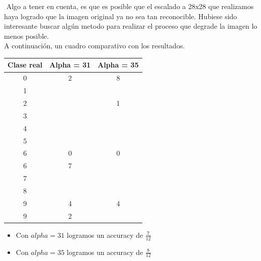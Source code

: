 $ $\newline
Algo a tener en cuenta, es que es posible que el escalado a 28x28 que realizamos haya logrado que la imagen original ya no sea tan reconocible. Hubiese sido interesante buscar algún metodo para realizar el proceso que degrade la imagen lo menos posible. \\

A continuación, un cuadro comparativo con los resultados. \\


\begin{center}
    \begin{tabular}{| c | c | c |}
    \hline
     Clase real    & Alpha = 31  & Alpha = 35 \\  \hline
     0 &     2  & 8 \\ \hline
     1 & \color{blue}{1} & \color{blue}{1} \\ \hline
     2 & \color{blue}{2} & 1 \\ \hline
     3 & \color{blue}{3} & \color{blue}{3} \\ \hline
     4 & \color{blue}{4} & \color{blue}{4} \\ \hline
     5 & \color{blue}{5} & \color{blue}{5} \\ \hline
     6 & 0 & 0 \\ \hline
     6 & 7 & \color{blue}{6} \\ \hline
     7 & \color{blue}{7} & \color{blue}{7} \\ \hline
     8 & \color{blue}{8} & \color{blue}{8} \\ \hline
     9 & 4 & 4 \\ \hline
     9 & 2 & \color{blue}{9} \\ \hline
    \end{tabular}
\end{center}

\begin{itemize}
\item Con $alpha=31$ logramos un accuracy de $\frac{7}{12}$
\item Con $alpha=35$ logramos un accuracy de $\frac{8}{12}$
\end{itemize}
